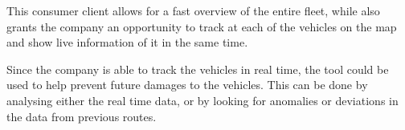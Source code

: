 \bigskip
This consumer client allows for a fast overview of the entire fleet, while also grants the company an opportunity to track at each of the vehicles on the map and show live information of it in the same time.

Since the company is able to track the vehicles in real time, the tool could be used to help prevent future damages to the vehicles.
This can be done by analysing either the real time data, or by looking for anomalies or deviations in the data from previous routes.

